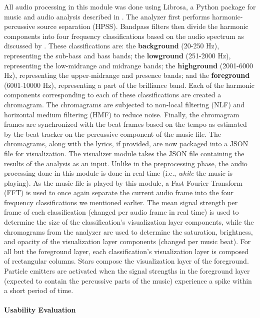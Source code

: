 \documentclass{sigchi-ext}
\begin{document}
All audio processing in this module was done using Librosa, a Python package for music and audio analysis described in \cite{McFee:2015}. The analyzer first performs harmonic-percussive source separation (HPSS). Bandpass filters then divide the harmonic components into four frequency classifications based on the audio spectrum as discussed by \cite{Leigh:2018}. These classifications are: the \textbf{background} (20-250 Hz), representing the sub-bass and bass bands; the \textbf{lowground} (251-2000 Hz), representing the low-midrange and midrange bands; the \textbf{highground} (2001-6000 Hz), representing the upper-midrange and presence bands; and the \textbf{foreground} (6001-10000 Hz), representing a part of the brilliance band. Each of the harmonic components corresponding to each of these classifications are created a chromagram. The chromagrams are subjected to non-local filtering (NLF) and horizontal medium filtering (HMF) to reduce noise. Finally, the chromagram frames are synchronized with the beat frames based on the tempo as estimated by the beat tracker on the percussive component of the music file. The chromagrams, along with the lyrics, if provided, are now packaged into a JSON file for visualization. The visualizer module takes the JSON file containing the results of the analysis as an input. Unlike in the preprocessing phase, the audio processing done in this module is done in real time (i.e., \textit{while} the music is playing). As the music file is played by this module, a Fast Fourier Transform (FFT) is used to once again separate the current audio frame into the four frequency classifications we mentioned earlier. The mean signal strength per frame of each classification (changed per audio frame in real time) is used to determine the size of the classification's visualization layer components, while the chromagrams from the analyzer are used to determine the saturation, brightness, and opacity of the visualization layer components (changed per music beat). For all but the foreground layer, each classification's visualization layer is composed of rectangular columns. Stars compose the visualization layer of the foreground. Particle emitters are activated when the signal strengths in the foreground layer (expected to contain the percussive parts of the music) experience a spike within a short period of time.



\paragraph{Usability Evaluation}
\end{document}
